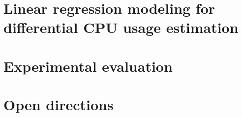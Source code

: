 \section{Linear regression modeling for differential CPU usage estimation}
\label{sec:2ndchap-our-approach} 
 

\section{Experimental evaluation}
\label{sec:2ndchap-experimental-eval} 



\section{Open directions}
\label{sec:2ndchap-open-directions} 

%

